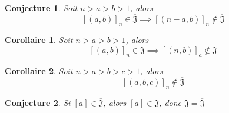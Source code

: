 \documentclass{article}
\newtheorem{conjecture}{Conjecture}
\newtheorem{corollary}{Corollaire}
\begin{document}
\begin{conjecture}
    Soit $n > a > b > 1$, alors
    \[ {[(a, b)]}_n \in \overline{\mathfrak{J}} \implies {[(n-a, b)]}_n \not \in \overline{\mathfrak{J}} \]
\end{conjecture}

\begin{corollary}
    Soit $n > a > b > 1$, alors
    \[ {[(a, b)]}_n \in \overline{\mathfrak{J}} \implies {[(n, b)]}_a \not \in \overline{\mathfrak{J}} \]
\end{corollary}

\begin{corollary}
    Soit $n > a > b > c > 1$, alors
    \[ {[(a, b, c)]}_n \not \in \overline{\mathfrak{J}} \]
\end{corollary}

\begin{conjecture}
    Si $[a] \in \overline{\mathfrak{J}}$, alors $[a] \in \mathfrak{J}$, donc $\mathfrak{J} = \overline{\mathfrak{J}}$
\end{conjecture}
\end{document}
